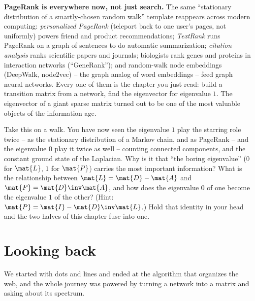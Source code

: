 \begin{applicationbox}
\textbf{PageRank is everywhere now, not just search.} The same ``stationary distribution of
a smartly-chosen random walk'' template reappears across modern computing:
\emph{personalized PageRank} (teleport back to one user's pages, not uniformly) powers
friend and product recommendations; \emph{TextRank} runs PageRank on a graph of sentences to
do automatic summarization; \emph{citation analysis} ranks scientific papers and journals;
biologists rank genes and proteins in interaction networks (``GeneRank''); and random-walk
node embeddings (DeepWalk, node2vec) -- the graph analog of word embeddings -- feed graph
neural networks. Every one of them is the chapter you just read: build a transition matrix
from a network, find the eigenvector for eigenvalue $1$. The eigenvector of a giant sparse
matrix turned out to be one of the most valuable objects of the information age.
\end{applicationbox}

\begin{walkbox}
Take this on a walk. You have now seen the eigenvalue $1$ play the starring role twice -- as
the stationary distribution of a Markov chain, and as PageRank -- and the eigenvalue $0$
play it twice as well -- counting connected components, and the constant ground state of the
Laplacian. Why is it that ``the boring eigenvalue'' ($0$ for $\mat{L}$, $1$ for $\mat{P}$)
carries the most important information? What is the relationship between $\mat{L} =
\mat{D}-\mat{A}$ and $\mat{P} = \mat{D}\inv\mat{A}$, and how does the eigenvalue $0$ of one
become the eigenvalue $1$ of the other? (Hint: $\mat{P} = \mat{I} - \mat{D}\inv\mat{L}$.)
Hold that identity in your head and the two halves of this chapter fuse into one.
\end{walkbox}

\section{Looking back}

We started with dots and lines and ended at the algorithm that organizes the web, and the
whole journey was powered by turning a network into a matrix and asking about its spectrum.


